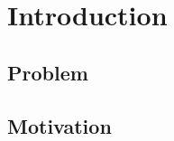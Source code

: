 

\section{Introduction}
\frame{
  
}

\subsection{Problem}
\frame{
  
}

\subsection{Motivation}
\frame{
  
}
